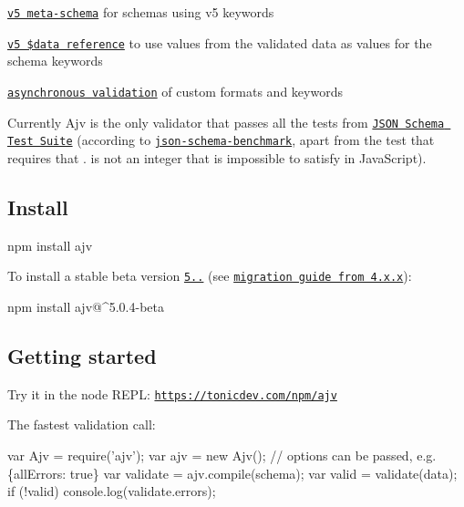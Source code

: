 \begin{DoxyItemize}
\item \href{https://raw.githubusercontent.com/epoberezkin/ajv/master/lib/refs/json-schema-v5.json#}{\tt v5 meta-\/schema} for schemas using v5 keywords
\item \href{#data-reference}{\tt v5 \$data reference} to use values from the validated data as values for the schema keywords
\item \href{#asynchronous-validation}{\tt asynchronous validation} of custom formats and keywords
\end{DoxyItemize}

Currently Ajv is the only validator that passes all the tests from \href{https://github.com/json-schema/JSON-Schema-Test-Suite}{\tt J\+S\+ON Schema Test Suite} (according to \href{https://github.com/ebdrup/json-schema-benchmark}{\tt json-\/schema-\/benchmark}, apart from the test that requires that {.} is not an integer that is impossible to satisfy in Java\+Script).

\subsection*{Install}


\begin{DoxyCode}
npm install ajv
\end{DoxyCode}


To install a stable beta version \href{https://github.com/epoberezkin/ajv/releases/tag/5.0.4-beta.3}{\tt 5..} (see \href{https://github.com/epoberezkin/ajv/releases/tag/5.0.1-beta.0}{\tt migration guide from 4.\+x.\+x})\+:


\begin{DoxyCode}
npm install ajv@^5.0.4-beta
\end{DoxyCode}


\subsection*{\label{_usage}%
Getting started}

Try it in the node R\+E\+PL\+: \href{https://tonicdev.com/npm/ajv}{\tt https\+://tonicdev.\+com/npm/ajv}

The fastest validation call\+:


\begin{DoxyCode}
var Ajv = require('ajv');
var ajv = new Ajv(); // options can be passed, e.g. \{allErrors: true\}
var validate = ajv.compile(schema);
var valid = validate(data);
if (!valid) console.log(validate.errors);
\end{DoxyCode}


